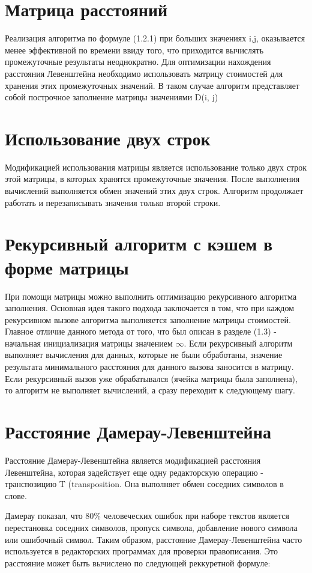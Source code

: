 \section{Матрица расстояний}
Реализация алгоритма по формуле (1.2.1) при больших значениях i,j, оказывается менее эффективной по времени ввиду того, что приходится вычислять промежуточные результаты неоднократно. Для оптимизации нахождения расстояния Левенштейна необходимо использовать матрицу стоимостей для хранения этих промежуточных значений. В таком случае алгоритм представляет собой построчное заполнение матрицы значениями D(i, j) 

\section{Использование двух строк}
Модификацией использования матрицы является использование только двух строк этой матрицы, в которых хранятся промежуточные значения. После выполнения вычислений выполняется обмен значений этих двух строк. Алгоритм продолжает работать и перезаписывать значения только второй строки.

\section{Рекурсивный алгоритм с кэшем в форме матрицы}
При помощи матрицы можно выполнить оптимизацию рекурсивного алгоритма заполнения. Основная идея такого подхода заключается в том, что при каждом рекурсивном вызове алгоритма выполняется заполнение матрицы стоимостей. Главное отличие данного метода от того, что был описан в разделе (1.3) - начальная инициализация матрицы значением $\infty$. Если рекурсивный алгоритм выполняет вычисления для данных, которые не были обработаны, значение результата минимального расстояния для данного вызова заносится в матрицу. Если рекурсивный вызов уже обрабатывался (ячейка матрицы была заполнена), то алгоритм не выполняет вычислений, а сразу переходит к следующему шагу.

\section{Расстояние Дамерау-Левенштейна}
Расстояние Дамерау-Левенштейна является модификацией расстояния Левенштейна, которая задействует еще одну редакторскую операцию - транспозицию T
(transposition. Она выполняет обмен соседних символов в слове.

Дамерау показал, что 80\% человеческих ошибок при наборе текстов является перестановка соседних символов, пропуск символа, добавление нового символа или ошибочный символ\cite{Damerau_Levenshtein}. Таким образом, расстояние Дамерау-Левенштейна часто используется в редакторских программах для проверки правописания.
Это расстояние может быть вычислено по следующей реккуретной формуле:

